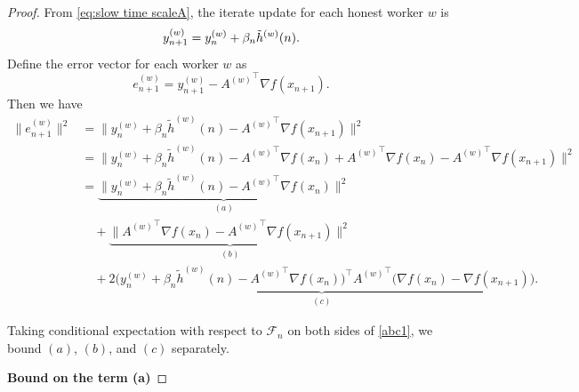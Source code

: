 \documentclass{article}
\begin{document}
\begin{proof}
 From \eqref{eq:slow time scaleA}, the iterate update for each honest worker $w$ is  
\[
    y_{n+1}^{(w)} = y_n^{(w)} + \beta_n \Tilde{h}^{(w)}(n).
\]  
Define the error vector for each worker $w$ as  
\[
    e_{n+1}^{(w)} = y_{n+1}^{(w)} - {A^{(w)}}^\top \nabla f(x_{n+1}).
\]  
Then we have  
\begin{equation}
\begin{split}
\|e_{n+1}^{(w)}\|^2
&= \Big\|
y_n^{(w)} + \beta_n \widetilde{h}^{(w)}(n) - {A^{(w)}}^\top \nabla f(x_{n+1})
\Big\|^2 \\
&= \Big\|
y_n^{(w)} + \beta_n \widetilde{h}^{(w)}(n) - {A^{(w)}}^\top \nabla f(x_n)
+ {A^{(w)}}^\top \nabla f(x_n) - {A^{(w)}}^\top \nabla f(x_{n+1})
\Big\|^2 \\
&=
\underbrace{\big\|
y_n^{(w)} + \beta_n \widetilde{h}^{(w)}(n) - {A^{(w)}}^\top \nabla f(x_n)
\big\|^2}_{(a)} \\
&\quad +
\underbrace{\big\|
{A^{(w)}}^\top \nabla f(x_n) - {A^{(w)}}^\top \nabla f(x_{n+1})
\big\|^2}_{(b)} \\
&\quad +
\underbrace{2 \Big(
y_n^{(w)} + \beta_n \widetilde{h}^{(w)}(n) - {A^{(w)}}^\top \nabla f(x_n)
\Big)^\top 
{A^{(w)}}^\top\big(
\nabla f(x_n) - \nabla f(x_{n+1})
\big)}_{(c)}.
\end{split}
\label{abc1}
\end{equation}

Taking conditional expectation with respect to $\mathcal{F}_n$ on both sides of \eqref{abc1}, we bound $(a)$, $(b)$, and $(c)$ separately.

\textbf{Bound on the term (a)}


\end{proof}
\end{document}
